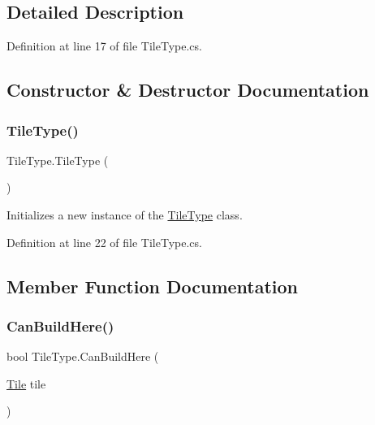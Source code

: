\subsection{Detailed Description}


Definition at line 17 of file Tile\+Type.\+cs.



\subsection{Constructor \& Destructor Documentation}
\mbox{\label{class_tile_type_abbcdc00951e1510c63f38613c9d63f59}} 
\subsubsection{\texorpdfstring{Tile\+Type()}{TileType()}}
{\footnotesize\ttfamily Tile\+Type.\+Tile\+Type (\begin{DoxyParamCaption}{ }\end{DoxyParamCaption})}



Initializes a new instance of the \hyperlink{class_tile_type}{Tile\+Type} class. 



Definition at line 22 of file Tile\+Type.\+cs.



\subsection{Member Function Documentation}
\mbox{\label{class_tile_type_ac981ce0a7c419814bcafdafba670d117}} 
\subsubsection{\texorpdfstring{Can\+Build\+Here()}{CanBuildHere()}}
{\footnotesize\ttfamily bool Tile\+Type.\+Can\+Build\+Here (\begin{DoxyParamCaption}\item[{\hyperlink{class_tile}{Tile}}]{tile }\end{DoxyParamCaption})}



